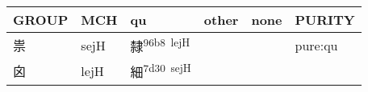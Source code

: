 \documentclass[14pt,a4paper]{scrartcl}
\begin{document}
\begin{longtable}[c]{@{}llllll@{}}
\toprule
\begin{minipage}[b]{0.14\columnwidth}\raggedright\strut
GROUP
\strut\end{minipage} &
\begin{minipage}[b]{0.14\columnwidth}\raggedright\strut
MCH
\strut\end{minipage} &
\begin{minipage}[b]{0.14\columnwidth}\raggedright\strut
qu
\strut\end{minipage} &
\begin{minipage}[b]{0.14\columnwidth}\raggedright\strut
other
\strut\end{minipage} &
\begin{minipage}[b]{0.14\columnwidth}\raggedright\strut
none
\strut\end{minipage} &
\begin{minipage}[b]{0.14\columnwidth}\raggedright\strut
PURITY
\strut\end{minipage}\tabularnewline
\midrule
\endhead
\begin{minipage}[t]{0.14\columnwidth}\raggedright\strut
祟
\strut\end{minipage} &
\begin{minipage}[t]{0.14\columnwidth}\raggedright\strut
sejH
\strut\end{minipage} &
\begin{minipage}[t]{0.14\columnwidth}\raggedright\strut
隸\textsuperscript{96b8~lejH}
\strut\end{minipage} &
\begin{minipage}[t]{0.14\columnwidth}\raggedright\strut
\strut\end{minipage} &
\begin{minipage}[t]{0.14\columnwidth}\raggedright\strut
\strut\end{minipage} &
\begin{minipage}[t]{0.14\columnwidth}\raggedright\strut
pure:qu
\strut\end{minipage}\tabularnewline
\begin{minipage}[t]{0.14\columnwidth}\raggedright\strut
囟
\strut\end{minipage} &
\begin{minipage}[t]{0.14\columnwidth}\raggedright\strut
lejH
\strut\end{minipage} &
\begin{minipage}[t]{0.14\columnwidth}\raggedright\strut
細\textsuperscript{7d30~sejH}
\strut\end{minipage} &

\end{longtable}
\end{document}
